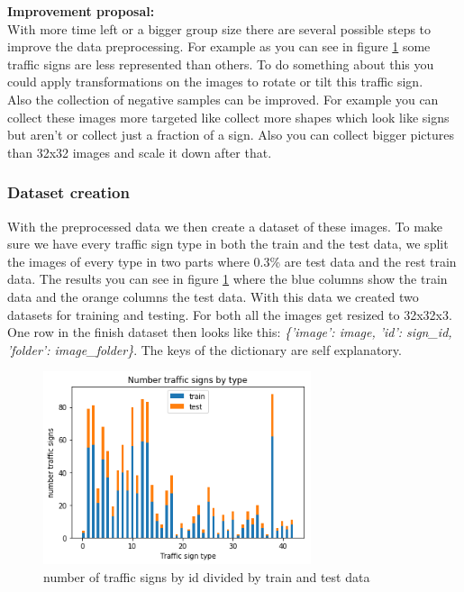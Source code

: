 \documentclass[12pt,a4paper,bibliography=totocnumbered,listof=totocnumbered]{scrartcl}
\begin{document}
\textbf{Improvement proposal:}\\
With more time left or a bigger group size there are several possible steps to improve the data preprocessing. For example as you can see in figure \ref{fig:data_hist} some traffic signs are less represented than others. To do something about this you could apply transformations on the images to rotate or tilt this traffic sign.\\
Also the collection of negative samples can be improved. For example you can collect these images more targeted like collect more shapes which look like signs but aren't or collect just a fraction of a sign. Also you can collect bigger pictures than 32x32 images and scale it down after that.

\subsubsection{Dataset creation}

With the preprocessed data we then create a dataset of these images. To make sure we have every traffic sign type in both the train and the test data, we split the images of every type in two parts where 0.3\% are test data and the rest train data. The results you can see in figure \ref{fig:data_hist} where the blue columns show the train data and the orange columns the test data. With this data we created two datasets for training and testing. For both all the images get resized to 32x32x3. One row in the finish dataset then looks like this: \textit{\{'image': image, 'id': sign_id, 'folder': image_folder\}}. The keys of the dictionary are self explanatory.

\begin{figure}[htbp] 
  \centering
     \includegraphics[width=0.7\textwidth]{data_hist}
  \caption{number of traffic signs by id divided by train and test data}
  \label{fig:data_hist}
\end{figure}
\end{document}
